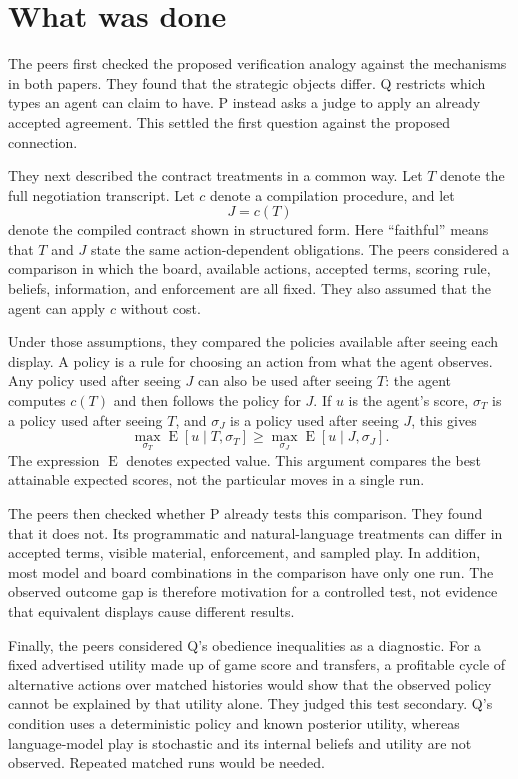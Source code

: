 \documentclass{article}
\begin{document}
\section{What was done}

The peers first checked the proposed verification analogy against the mechanisms in both papers. They found that the strategic objects differ. Q restricts which types an agent can claim to have. P instead asks a judge to apply an already accepted agreement. This settled the first question against the proposed connection.

They next described the contract treatments in a common way. Let $T$ denote the full negotiation transcript. Let $c$ denote a compilation procedure, and let
\[
  J=c(T)
\]
denote the compiled contract shown in structured form. Here ``faithful'' means that $T$ and $J$ state the same action-dependent obligations. The peers considered a comparison in which the board, available actions, accepted terms, scoring rule, beliefs, information, and enforcement are all fixed. They also assumed that the agent can apply $c$ without cost.

Under those assumptions, they compared the policies available after seeing each display. A policy is a rule for choosing an action from what the agent observes. Any policy used after seeing $J$ can also be used after seeing $T$: the agent computes $c(T)$ and then follows the policy for $J$. If $u$ is the agent's score, $\sigma_T$ is a policy used after seeing $T$, and $\sigma_J$ is a policy used after seeing $J$, this gives
\[
  \max_{\sigma_T} \operatorname{E}[u\mid T,\sigma_T]
  \geq
  \max_{\sigma_J} \operatorname{E}[u\mid J,\sigma_J].
\]
The expression $\operatorname{E}$ denotes expected value. This argument compares the best attainable expected scores, not the particular moves in a single run.

The peers then checked whether P already tests this comparison. They found that it does not. Its programmatic and natural-language treatments can differ in accepted terms, visible material, enforcement, and sampled play. In addition, most model and board combinations in the comparison have only one run. The observed outcome gap is therefore motivation for a controlled test, not evidence that equivalent displays cause different results.

Finally, the peers considered Q's obedience inequalities as a diagnostic. For a fixed advertised utility made up of game score and transfers, a profitable cycle of alternative actions over matched histories would show that the observed policy cannot be explained by that utility alone. They judged this test secondary. Q's condition uses a deterministic policy and known posterior utility, whereas language-model play is stochastic and its internal beliefs and utility are not observed. Repeated matched runs would be needed.
\end{document}
